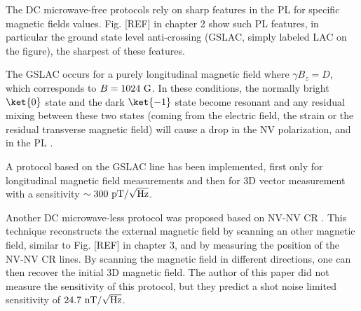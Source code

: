 \documentclass[a4paper, 11pt]{book}
\begin{document}

The DC microwave-free protocols rely on sharp features in the PL for specific magnetic fields values. Fig. [REF] in chapter 2 show such PL features, in particular the ground state level anti-crossing (GSLAC, simply labeled LAC on the figure), the sharpest of these features.

The GSLAC occurs for a purely longitudinal magnetic field where $\gamma B_z = D$, which corresponds to $B=1024\ \rm G$. In these conditions, the normally bright $\ket{0}$ state and the dark $\ket{-1}$ state become resonant and any residual mixing between these two states (coming from the electric field, the strain or the residual transverse magnetic field) will cause a drop in the NV polarization, and in the PL \citep{broadway2016anticrossing}. 

A protocol based on the GSLAC line has been implemented, first only for longitudinal magnetic field measurements \citep{wickenbrock2016microwave} and then for 3D vector measurement \citep{zheng2020microwave} with a sensitivity $\sim 300\ \rm pT/\sqrt{\rm Hz}$.

Another DC microwave-less protocol was proposed based on NV-NV CR \citep{akhmedzhanov2017microwave, akhmedzhanov2019magnetometry}. This technique reconstructs the external magnetic field by scanning an other magnetic field, similar to Fig. [REF] in chapter 3, and by measuring the position of the NV-NV CR lines. By scanning the magnetic field in different directions, one can then recover the initial 3D magnetic field. The author of this paper did not measure the sensitivity of this protocol, but they predict a shot noise limited sensitivity of $24.7\ \rm nT/\sqrt{\rm Hz}$.

%
\end{document}
